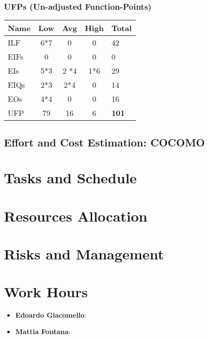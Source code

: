 \documentclass[11pt, a4paper,titlepage]{article}
\begin{document}
		\subsubsection{UFPs (Un-adjusted Function-Points)}
		\begin{tabularx}{\textwidth}{|X|c|c|c|l|}
			\hline
			\textbf{Name} &	\textbf{Low} & \textbf{Avg} & \textbf{High} & \textbf{Total}\\
			\hline
			ILF &	6*7 &	0 &	0 &	42 \\
			EIFs & 0  &	0 &	0 &	0 \\
			EIs & 5*3 & 2 *4 & 1*6 & 29 \\
			EIQs & 2*3 & 2*4 & 0 & 14 \\
			EOs & 4*4 & 0 & 0 & 16 \\
			\hline
			UFP & 79 & 16 & 6 & \textbf{101} \\			
			\hline
		\end{tabularx}
		\newpage
		\subsection{Effort and Cost Estimation: COCOMO}
	\section{Tasks and Schedule}
	\section{Resources Allocation}
	\section{Risks and Management}








	\section{Work Hours}
		\begin{itemize}
			\item \textbf{Edoardo Giacomello}: 
			\item \textbf{Mattia Fontana}: 
		\end{itemize}	
\end{document}
